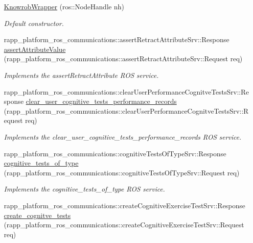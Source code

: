 \begin{DoxyCompactItemize}
\item 
\hyperlink{classKnowrobWrapper_adfaff3e5574aa56d54fcf31c36fd3450}{Knowrob\-Wrapper} (ros\-::\-Node\-Handle nh)
\begin{DoxyCompactList}\small\item\em Default constructor. \end{DoxyCompactList}\item 
rapp\-\_\-platform\-\_\-ros\-\_\-communications\-::assert\-Retract\-Attribute\-Srv\-::\-Response \hyperlink{classKnowrobWrapper_a7dc0ea0f609179e541e51b5351c47243}{assert\-Attribute\-Value} (rapp\-\_\-platform\-\_\-ros\-\_\-communications\-::assert\-Retract\-Attribute\-Srv\-::\-Request req)
\begin{DoxyCompactList}\small\item\em Implements the assert\-Retract\-Attribute R\-O\-S service. \end{DoxyCompactList}\item 
rapp\-\_\-platform\-\_\-ros\-\_\-communications\-::clear\-User\-Performance\-Cognitve\-Tests\-Srv\-::\-Response \hyperlink{classKnowrobWrapper_ad80bcfe67c92da6bd3d5edf22d465c38}{clear\-\_\-user\-\_\-cognitive\-\_\-tests\-\_\-performance\-\_\-records} (rapp\-\_\-platform\-\_\-ros\-\_\-communications\-::clear\-User\-Performance\-Cognitve\-Tests\-Srv\-::\-Request req)
\begin{DoxyCompactList}\small\item\em Implements the clear\-\_\-user\-\_\-cognitive\-\_\-tests\-\_\-performance\-\_\-records R\-O\-S service. \end{DoxyCompactList}\item 
rapp\-\_\-platform\-\_\-ros\-\_\-communications\-::cognitive\-Tests\-Of\-Type\-Srv\-::\-Response \hyperlink{classKnowrobWrapper_a6b97ec7ecde086f444cfce881c4625dc}{cognitive\-\_\-tests\-\_\-of\-\_\-type} (rapp\-\_\-platform\-\_\-ros\-\_\-communications\-::cognitive\-Tests\-Of\-Type\-Srv\-::\-Request req)
\begin{DoxyCompactList}\small\item\em Implements the cognitive\-\_\-tests\-\_\-of\-\_\-type R\-O\-S service. \end{DoxyCompactList}\item 
rapp\-\_\-platform\-\_\-ros\-\_\-communications\-::create\-Cognitive\-Exercise\-Test\-Srv\-::\-Response \hyperlink{classKnowrobWrapper_a21bb40079cf4cd21afe114f51ec6125b}{create\-\_\-cognitve\-\_\-tests} (rapp\-\_\-platform\-\_\-ros\-\_\-communications\-::create\-Cognitive\-Exercise\-Test\-Srv\-::\-Request req)

\end{DoxyCompactItemize}
